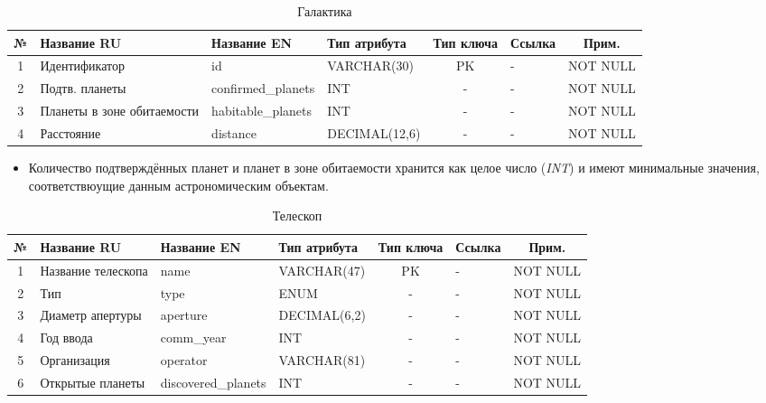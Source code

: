 \documentclass[14pt,a4paper]{extarticle}
\begin{document}
	\begin{table}[H]
		\centering
		\caption{Галактика}
		\small
\begin{tabular}{|c|p{3.2cm}|p{2.6cm}|p{2.8cm}|c|p{2.5cm}|c|}
\hline
№ & Название RU & Название EN & Тип атрибута & Тип ключа & Ссылка & Прим. \\
\hline
1 & Идентификатор & id & VARCHAR(30) & PK & - & NOT NULL \\
2 & Подтв. планеты & confirmed_planets & INT & - & - & NOT NULL \\
3 & Планеты в зоне обитаемости & habitable_planets & INT & - & - & NOT NULL \\
4 & Расстояние & distance & DECIMAL(12,6) & - & - & NOT NULL \\
\hline
\end{tabular}
	\end{table}

	\begin{itemize}
		\item Количество подтверждённых планет и планет в зоне обитаемости хранится как целое число (\textit{INT}) и имеют минимальные значения, соответствюущие данным астрономическим объектам.
	\end{itemize}

	\begin{table}[H]
		\centering
		\caption{Телескоп}
		\small
\begin{tabular}{|c|p{3.2cm}|p{2.6cm}|p{2.8cm}|c|p{2.5cm}|c|}
\hline
№ & Название RU & Название EN & Тип атрибута & Тип ключа & Ссылка & Прим. \\
\hline
1 & Название телескопа & name & VARCHAR(47) & PK & - & NOT NULL \\
2 & Тип & type & ENUM & - & - & NOT NULL \\
3 & Диаметр апертуры & aperture & DECIMAL(6,2) & - & - & NOT NULL \\
4 & Год ввода & comm_year & INT & - & - & NOT NULL \\
5 & Организация & operator & VARCHAR(81) & - & - & NOT NULL \\
6 & Открытые планеты & discovered_planets & INT & - & - & NOT NULL \\
\hline
\end{tabular}
	\end{table}
\end{document}
